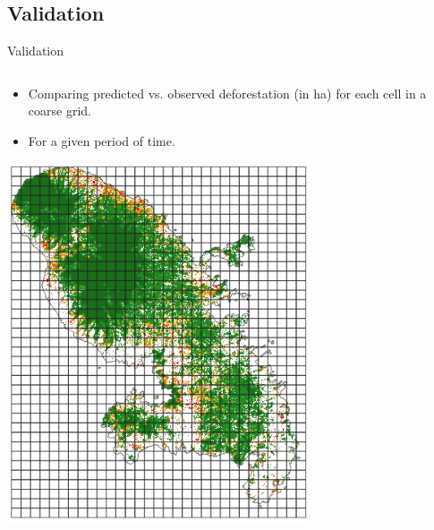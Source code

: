 \documentclass[10pt,table,dvipsnames,compress]{beamer}
\begin{document}
\subsection{Validation}
\label{sec:org384bc69}

\begin{frame}[label={sec:org2b0ec9c}]{Validation}
\begin{columns}
\begin{column}{0.5\columnwidth}
\begin{itemize}
\item Comparing predicted vs. observed deforestation (in ha) for each cell in a coarse grid.
\item For a given period of time.
\end{itemize}
\begin{center}
\includegraphics[width=0.7\textwidth]{figs/grid.png}
\end{center}  
\end{column}
\begin{column}{0.5\columnwidth}
\begin{center}

\end{center}
\end{column}
\end{columns}
\end{frame}
\end{document}
